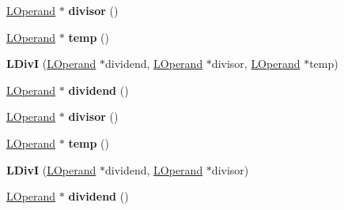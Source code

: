 \begin{DoxyCompactItemize}
\item 
\hyperlink{classv8_1_1internal_1_1_l_operand}{L\+Operand} $\ast$ {\bfseries divisor} ()\hypertarget{classv8_1_1internal_1_1_l_div_i_a5ceb6d1f5a2f1f0c998966e525a2cb3c}{}\label{classv8_1_1internal_1_1_l_div_i_a5ceb6d1f5a2f1f0c998966e525a2cb3c}

\item 
\hyperlink{classv8_1_1internal_1_1_l_operand}{L\+Operand} $\ast$ {\bfseries temp} ()\hypertarget{classv8_1_1internal_1_1_l_div_i_ab28d8d7ab78227bb8dcc89a205a7c7be}{}\label{classv8_1_1internal_1_1_l_div_i_ab28d8d7ab78227bb8dcc89a205a7c7be}

\item 
{\bfseries L\+DivI} (\hyperlink{classv8_1_1internal_1_1_l_operand}{L\+Operand} $\ast$dividend, \hyperlink{classv8_1_1internal_1_1_l_operand}{L\+Operand} $\ast$divisor, \hyperlink{classv8_1_1internal_1_1_l_operand}{L\+Operand} $\ast$temp)\hypertarget{classv8_1_1internal_1_1_l_div_i_a2c447a721208972b1aa2bbbdf5ae58c9}{}\label{classv8_1_1internal_1_1_l_div_i_a2c447a721208972b1aa2bbbdf5ae58c9}

\item 
\hyperlink{classv8_1_1internal_1_1_l_operand}{L\+Operand} $\ast$ {\bfseries dividend} ()\hypertarget{classv8_1_1internal_1_1_l_div_i_a324dcd2105a5772942591b32a93edf8c}{}\label{classv8_1_1internal_1_1_l_div_i_a324dcd2105a5772942591b32a93edf8c}

\item 
\hyperlink{classv8_1_1internal_1_1_l_operand}{L\+Operand} $\ast$ {\bfseries divisor} ()\hypertarget{classv8_1_1internal_1_1_l_div_i_a5ceb6d1f5a2f1f0c998966e525a2cb3c}{}\label{classv8_1_1internal_1_1_l_div_i_a5ceb6d1f5a2f1f0c998966e525a2cb3c}

\item 
\hyperlink{classv8_1_1internal_1_1_l_operand}{L\+Operand} $\ast$ {\bfseries temp} ()\hypertarget{classv8_1_1internal_1_1_l_div_i_ab28d8d7ab78227bb8dcc89a205a7c7be}{}\label{classv8_1_1internal_1_1_l_div_i_ab28d8d7ab78227bb8dcc89a205a7c7be}

\item 
{\bfseries L\+DivI} (\hyperlink{classv8_1_1internal_1_1_l_operand}{L\+Operand} $\ast$dividend, \hyperlink{classv8_1_1internal_1_1_l_operand}{L\+Operand} $\ast$divisor)\hypertarget{classv8_1_1internal_1_1_l_div_i_a749d0ff2a9a8321f7fee1549d65f2fb5}{}\label{classv8_1_1internal_1_1_l_div_i_a749d0ff2a9a8321f7fee1549d65f2fb5}

\item 
\hyperlink{classv8_1_1internal_1_1_l_operand}{L\+Operand} $\ast$ {\bfseries dividend} ()\hypertarget{classv8_1_1internal_1_1_l_div_i_a324dcd2105a5772942591b32a93edf8c}{}\label{classv8_1_1internal_1_1_l_div_i_a324dcd2105a5772942591b32a93edf8c}


\end{DoxyCompactItemize}
